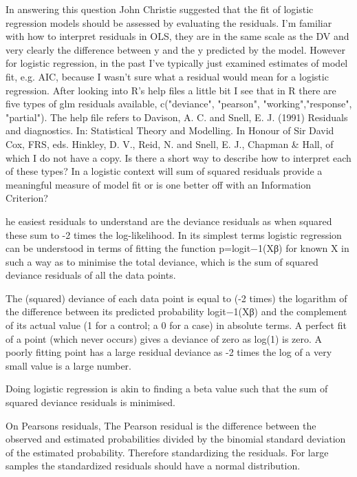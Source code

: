 

In answering this question John Christie suggested that the fit of logistic regression models should be assessed by evaluating the residuals. I'm familiar with how to interpret residuals in OLS, they are in the same scale as the DV and very clearly the difference between y and the y predicted by the model. However for logistic regression, in the past I've typically just examined estimates of model fit, e.g. AIC, because I wasn't sure what a residual would mean for a logistic regression. After looking into R's help files a little bit I see that in R there are five types of glm residuals available, c("deviance", "pearson", "working","response", "partial"). The help file refers to Davison, A. C. and Snell, E. J. (1991) Residuals and diagnostics. In: Statistical Theory and Modelling. In Honour of Sir David Cox, FRS, eds. Hinkley, D. V., Reid, N. and Snell, E. J., Chapman & Hall, of which I do not have a copy. Is there a short way to describe how to interpret each of these types? In a logistic context will sum of squared residuals provide a meaningful measure of model fit or is one better off with an Information Criterion?

he easiest residuals to understand are the deviance residuals as when squared these sum to -2 times the log-likelihood. In its simplest terms logistic regression can be understood in terms of fitting the function p=logit−1(Xβ) for known X in such a way as to minimise the total deviance, which is the sum of squared deviance residuals of all the data points.

The (squared) deviance of each data point is equal to (-2 times) the logarithm of the difference between its predicted probability logit−1(Xβ) and the complement of its actual value (1 for a control; a 0 for a case) in absolute terms. A perfect fit of a point (which never occurs) gives a deviance of zero as log(1) is zero. A poorly fitting point has a large residual deviance as -2 times the log of a very small value is a large number.

Doing logistic regression is akin to finding a beta value such that the sum of squared deviance residuals is minimised.




On Pearsons residuals,
The Pearson residual is the difference between the observed and estimated probabilities divided by the binomial standard deviation of the estimated probability. Therefore standardizing the residuals. For large samples the standardized residuals should have a normal distribution.

